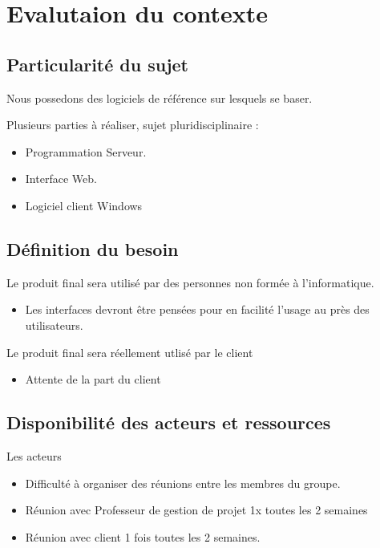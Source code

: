 \chapter{Evalutaion du contexte}

\section{Particularité du sujet}
Nous possedons des logiciels de référence sur lesquels se baser.\\ \newline

Plusieurs parties à réaliser, sujet pluridisciplinaire :
\begin{itemize}
	\item Programmation Serveur.
	\item Interface Web.
	\item Logiciel client Windows
\end{itemize}

\section{Définition du besoin}
Le produit final sera utilisé par des personnes non formée à l'informatique. 
\begin{itemize}	
	\item Les interfaces devront être pensées pour en facilité l'usage au près des utilisateurs.\newline
\end{itemize}

Le produit final sera réellement utlisé par le client
\begin{itemize}
	\item Attente de la part du client
\end{itemize}

\section{Disponibilité des acteurs et ressources}
Les acteurs
\begin{itemize}
	\item Difficulté à organiser des réunions entre les membres du groupe.
	\item Réunion avec Professeur de gestion de projet 1x toutes les 2 semaines 
	\item Réunion avec client 1 fois toutes les 2 semaines.\newline
\end{itemize}

